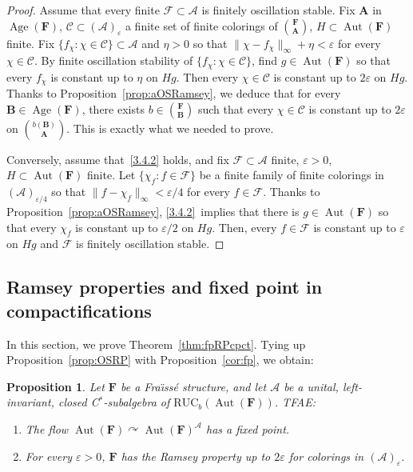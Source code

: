 \documentclass[11pt]{article}
\newtheorem{prop}[theo]{Proposition}
\theoremstyle{definition}
\numberwithin{equation}{section}
\numberwithin{figure}{section}
\numberwithin{table}{section}
\newcommand{\A}{\mathcal A}
\newcommand*{\mA}{\mathbf{A}}
\newcommand*{\mB}{\mathbf{B}}
\newcommand*{\mF}{\mathbf{F}}
\newcommand{\e}{\varepsilon}
\DeclareMathOperator{\Aut}{Aut}
\DeclareMathOperator{\Age}{Age}
\newcommand{\actson}{\curvearrowright}
\newcommand{\RUCB}{\mathrm{RUC}_{b}}
\begin{document}
\begin{proof}
Assume that every finite $\mathcal F\subset \A$ is finitely oscillation stable. Fix $\mA$ in $\Age(\mF)$, $\mathcal C \subset (\A)_{\e}$ a finite set of finite colorings of $\binom{\mF}{\mA}$, $H\subset \Aut(\mF)$ finite. Fix $\{ f_{\chi}: \chi\in \mathcal C\}\subset \A$ and $\eta >0$ so that $\| \chi - f_{\chi}\|_{\infty}+\eta<\e$ for every $\chi \in \mathcal C$. By finite oscillation stability of $\{ f_{\chi}: \chi\in \mathcal C\}$, find $g\in \Aut(\mF)$ so that every $f_{\chi}$ is constant up to $\eta$ on $Hg$. Then every $\chi \in \mathcal C$ is constant up to $2\e$ on $Hg$. Thanks to Proposition~\ref{prop:aOSRamsey}, we deduce that for every $\mB \in \Age(\mF)$, there exists $b\in \binom{\mF}{\mB}$ such that every $\chi\in \mathcal C$ is constant up to $2\e$ on $\binom{b(\mB)}{\mA}$. This is exactly what we needed to prove.

Conversely, assume that~\eqref{3.4.2} holds, and fix $\mathcal F\subset \mathcal A$ finite, $\e>0$, $H\subset \Aut(\mF)$ finite. Let $\{ \chi_{f} : f\in \mathcal F\}$ be a finite family of finite colorings in $(\A)_{\e/4}$ so that $\| f-\chi_{f}\|_{\infty}<\e/4$ for every $f\in \mathcal F$. Thanks to Proposition~\ref{prop:aOSRamsey}, \eqref{3.4.2}~implies that there is $g\in \Aut(\mF)$ so that every $\chi_{f}$ is constant up to $\e/2$ on $Hg$. Then, every $f\in \mathcal F$ is constant up to $\e$ on $Hg$ and $\mathcal F$ is finitely oscillation stable.
\end{proof}

\subsection{Ramsey properties and fixed point in compactifications}

In this section, we prove Theorem~\ref{thm:fpRPcpct}. Tying up Proposition~\ref{prop:OSRP} with Proposition~\ref{cor:fp}, we obtain:

\begin{prop}\label{cor:fpaRP}
Let $\mF$ be a Fra\"{\i}ss\'e structure, and let $\A$ be a unital, left-invariant, closed C$^{*}$-subalgebra of $\RUCB(\Aut(\mF))$. TFAE:
\begin{enumerate}
\item \label{3.5.1} The flow $\Aut(\mF)\actson \Aut(\mF)^{\A}$ has a fixed point.
\item \label{3.5.2} For every $\e>0$, $\mF$ has the Ramsey property up to $2\e$ for colorings in $(\A)_{\e}$.
\end{enumerate}
\end{prop}
\end{document}
